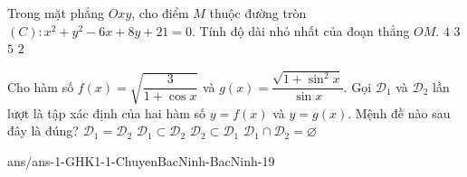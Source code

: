 \begin{ex}%
	Trong mặt phẳng $Oxy$, cho điểm $M$ thuộc đường tròn $(C)\colon x^2+y^2-6x+8y+21=0$. Tính độ dài nhỏ nhất của đoạn thẳng $OM$.
	\choice
	{$4$}
	{\True $3$}
	{$5$}
	{$2$}
\end{ex}

\begin{ex}%
	Cho hàm số $f(x)=\sqrt{\dfrac{3}{1+\cos x}}$ và $g(x)=\dfrac{\sqrt{1+\sin^2x}}{\sin x}$. Gọi $\mathscr{D}_1$ và $\mathscr{D}_2$ lần lượt là tập xác định của hai hàm số $y=f(x)$ và $y=g(x)$. Mệnh đề nào sau đây là đúng?
	\choice
	{$\mathscr{D}_1=\mathscr{D}_2$}
	{$\mathscr{D}_1\subset \mathscr{D}_2$}
	{\True $\mathscr{D}_2\subset \mathscr{D}_1$}
	{$\mathscr{D}_1\cap \mathscr{D}_2=\varnothing$}
\end{ex}


\begin{indapan}{10}
	{ans/ans-1-GHK1-1-ChuyenBacNinh-BacNinh-19}
\end{indapan}
